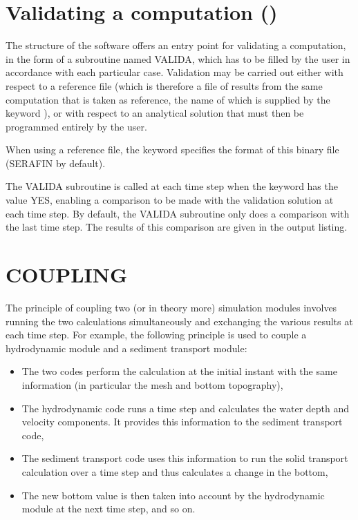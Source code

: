\section{Validating a computation ()}

The structure of the  software offers an entry point for validating a
computation, in the form of a subroutine named VALIDA, which has to be filled
by the user in accordance with each particular case. Validation may be carried
out either with respect to a reference file (which is therefore a file of
results from the same computation that is taken as reference, the name of which
is supplied by the keyword ), or with respect to an
analytical solution that must then be programmed entirely by the user.

When using a reference file, the keyword 
specifies the format of this binary file (SERAFIN by default).

The VALIDA subroutine is called at each time step when the keyword
 has the value YES, enabling a comparison to be made with
the validation solution at each time step. By default, the VALIDA subroutine
only does a comparison with the last time step. The results of this comparison
are given in the output listing.


\section{ COUPLING}

The principle of coupling two (or in theory more) simulation modules involves
running the two calculations simultaneously and exchanging the various results
at each time step. For example, the following principle is used to couple a
hydrodynamic module and a sediment transport module:

\begin{itemize}
\item  The two codes perform the calculation at the initial instant with the
same information (in particular the mesh and bottom topography),

\item  The hydrodynamic code runs a time step and calculates the water depth
and velocity components. It provides this information to the sediment transport
code,

\item  The sediment transport code uses this information to run the solid
transport calculation over a time step and thus calculates a change in the
bottom,

\item  The new bottom value is then taken into account by the hydrodynamic
module at the next time step, and so on.
\end{itemize}

